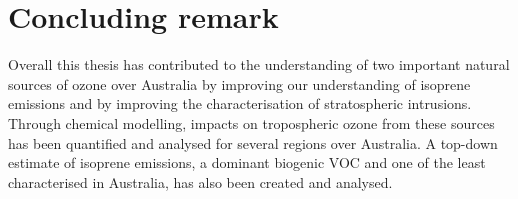   \section{Concluding remark}
  Overall this thesis has contributed to the understanding of two important natural sources of ozone over Australia by improving our understanding of isoprene emissions and by improving the characterisation of stratospheric intrusions.
  Through chemical modelling, impacts on tropospheric ozone from these sources has been quantified and analysed for several regions over Australia.
  A top-down estimate of isoprene emissions, a dominant biogenic VOC and one of the least characterised in Australia, has also been created and analysed.